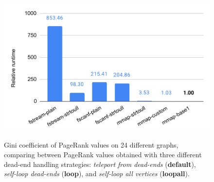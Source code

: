 \begin{figure}[hbtp]
  \centering
  \includegraphics[width=0.99\linewidth]{out/optimize-el.pdf} \\[-2ex]
  \caption{Gini coefficient of PageRank values on 24 different graphs, comparing between PageRank values obtained with three different dead-end handling strategies: \textit{teleport from dead-ends} (\textbf{default}), \textit{self-loop dead-ends} (\textbf{loop}), and \textit{self-loop all vertices} (\textbf{loopall}).}
  \label{fig:optimize-el}
\end{figure}
